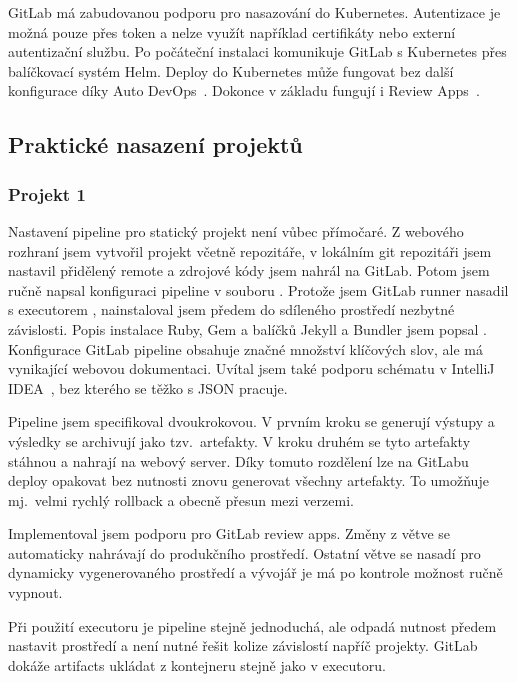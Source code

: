         GitLab má zabudovanou podporu pro nasazování do Kubernetes. Autentizace je možná pouze přes token a nelze využít například certifikáty nebo externí autentizační službu. Po počáteční instalaci komunikuje GitLab s Kubernetes přes balíčkovací systém Helm. Deploy do Kubernetes může fungovat bez další konfigurace díky Auto DevOps~\cite{gitlab-auto-devops}. Dokonce v základu fungují i Review Apps~\cite{gitlab-review-apps}.

    \subsection{Praktické nasazení projektů}
        \subsubsection{Projekt 1}
            \label{subsec:gitlab-p1}
            Nastavení pipeline pro statický projekt není vůbec přímočaré. Z webového rozhraní jsem vytvořil projekt včetně repozitáře, v lokálním git repozitáři jsem nastavil přidělený remote a zdrojové kódy jsem nahrál na GitLab. Potom jsem ručně napsal konfiguraci pipeline v souboru . Protože jsem GitLab runner nasadil s executorem , nainstaloval jsem předem do sdíleného prostředí nezbytné závislosti. Popis instalace Ruby, Gem a balíčků Jekyll a Bundler jsem popsal . Konfigurace GitLab pipeline obsahuje značné množství klíčových slov, ale má vynikající webovou dokumentaci. Uvítal jsem také podporu schématu v  IntelliJ IDEA~\cite{idea-gitlab-plugin}, bez kterého se těžko s JSON pracuje.

            Pipeline jsem specifikoval dvoukrokovou. V prvním kroku se generují výstupy a výsledky se archivují jako tzv.~artefakty. V kroku druhém  se tyto artefakty stáhnou a nahrají na webový server. Díky tomuto rozdělení lze na GitLabu deploy opakovat bez nutnosti znovu generovat všechny artefakty. To umožňuje mj.~velmi rychlý rollback a obecně přesun mezi verzemi.

            Implementoval jsem podporu pro GitLab review apps. Změny z větve  se automaticky nahrávají do produkčního prostředí. Ostatní větve se nasadí pro dynamicky vygenerovaného prostředí a vývojář je má po kontrole možnost ručně vypnout.

            Při použití  executoru je pipeline stejně jednoduchá, ale odpadá nutnost předem nastavit prostředí a není nutné řešit kolize závislostí napříč projekty. GitLab dokáže artifacts ukládat z kontejneru stejně jako v  executoru.

